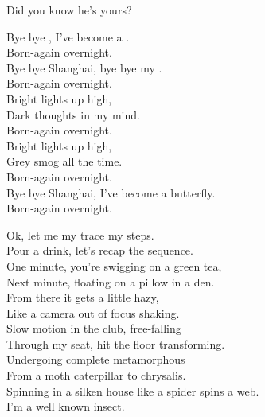 Did you know he's yours? \\





Bye bye , I've become a . \\
Born-again overnight. \\
Bye bye Shanghai, bye bye my . \\
Born-again overnight. \\

Bright lights up high, \\
Dark thoughts in my mind. \\
Born-again overnight. \\

Bright lights up high, \\
Grey smog all the time. \\
Born-again overnight. \\

Bye bye Shanghai, I've become a butterfly. \\
Born-again overnight. \\


Ok, let me my trace my steps. \\
Pour a drink, let's recap the sequence. \\
One minute, you're swigging on a green tea, \\
Next minute, floating on a pillow in a den. \\

From there it gets a little hazy, \\
Like a camera out of focus shaking. \\
Slow motion in the club, free-falling \\
Through my seat, hit the floor transforming. \\

Undergoing complete metamorphous \\
From a moth caterpillar to chrysalis. \\
Spinning in a silken house like a spider spins a web. \\
I'm a well known insect. \\

